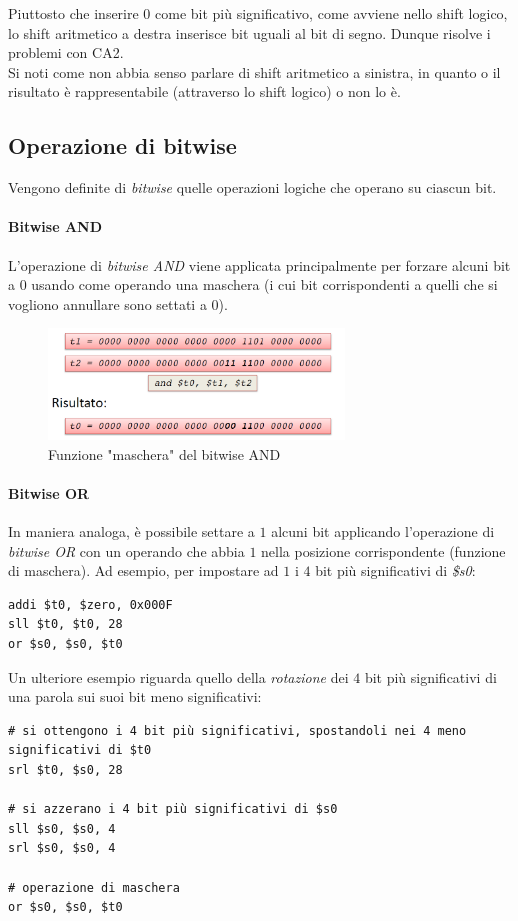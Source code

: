 \documentclass[class=book, crop=false]{standalone}
\begin{document}
Piuttosto che inserire 0 come bit più significativo, come avviene nello shift logico, lo shift aritmetico a destra inserisce bit uguali al bit di segno. Dunque risolve i problemi con CA2.\\
Si noti come non abbia senso parlare di shift aritmetico a sinistra, in quanto o il risultato è rappresentabile (attraverso lo shift logico) o non lo è.

\subsection{Operazione di bitwise}
Vengono definite di \emph{bitwise} quelle operazioni logiche che operano su ciascun bit.

\paragraph{Bitwise AND}
L'operazione di \emph{bitwise AND} viene applicata principalmente per forzare alcuni bit a 0 usando come operando una maschera (i cui bit corrispondenti a quelli che si vogliono annullare sono settati a 0).
\begin{figure}[H]
	\centering
	\includegraphics[width=0.7\textwidth,keepaspectratio]{bitwise_and}
	\caption{Funzione "maschera" del bitwise AND}
\end{figure}

\paragraph{Bitwise OR}
In maniera analoga, è possibile settare a \(1\) alcuni bit applicando l'operazione di \emph{bitwise OR} con un operando che abbia \(1\) nella posizione corrispondente (funzione di maschera). Ad esempio, per impostare ad \(1\) i \(4\) bit più significativi di \emph{\$s0}:
\begin{verbatim}
addi $t0, $zero, 0x000F
sll $t0, $t0, 28
or $s0, $s0, $t0
\end{verbatim}

Un ulteriore esempio riguarda quello della \emph{rotazione} dei \(4\) bit più significativi di una parola sui suoi bit meno significativi:
\begin{verbatim}
# si ottengono i 4 bit più significativi, spostandoli nei 4 meno significativi di $t0
srl $t0, $s0, 28

# si azzerano i 4 bit più significativi di $s0
sll $s0, $s0, 4
srl $s0, $s0, 4

# operazione di maschera
or $s0, $s0, $t0
\end{verbatim}
\end{document}
